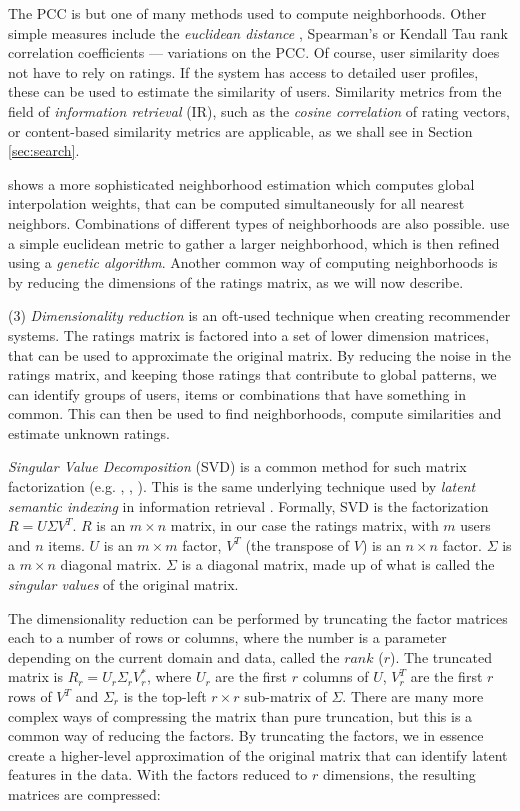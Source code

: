 The PCC is but one of many methods used to compute neighborhoods. 
Other simple measures include the \emph{euclidean distance} \cite[p10]{Segaran2007},
Spearman's or Kendall Tau rank correlation coefficients \cite[p30]{Herlocker2004} --- 
variations on the PCC.
Of course, user similarity does not have to rely on ratings. 
If the system has access to detailed user profiles, these can be used
to estimate the similarity of users.
Similarity metrics from the field of \emph{information retrieval} (IR),
such as the \emph{cosine correlation} of rating vectors,
or content-based similarity metrics are applicable,
as we shall see in Section \ref{sec:search}.

\cite{Bell2007a} shows a more sophisticated neighborhood estimation which computes global interpolation weights,
that can be computed simultaneously for all nearest neighbors.
Combinations of different types of neighborhoods are also possible. 
\cite{Ujjin} use a simple euclidean metric to gather a larger neighborhood, which is then refined using a \emph{genetic algorithm}.
Another common way of computing neighborhoods is by reducing the dimensions of the ratings matrix, as we will now describe.

(3) \emph{Dimensionality reduction} is an oft-used technique when creating recommender systems.
The ratings matrix is factored into a set of lower dimension matrices, that can be used to approximate the original matrix.
By reducing the noise in the ratings matrix, and keeping those ratings that contribute to global patterns,
we can identify groups of users, items or combinations that have something in common.
This can then be used to find neighborhoods, compute similarities and estimate unknown ratings.

\emph{Singular Value Decomposition} (SVD) is a common method for such matrix factorization (e.g. \citet[p5]{Billsus}, \citet{Sun2005}, \citet{Bell2007}).  
This is the same underlying technique used by \emph{latent semantic indexing} in information retrieval \cite[p44]{Baeza-Yates1999}.
Formally, SVD is the factorization $R = U \Sigma V^{T}$. 
$R$ is an $m \times n$ matrix, in our case the ratings matrix, with $m$ users and $n$ items. 
$U$ is an $m \times m$ factor, $V^{T}$ (the transpose of $V$) is an $n \times n$ factor.
$\Sigma$ is a $m \times n$ diagonal matrix. 
$\Sigma$ is a diagonal matrix, made up of what is called the \emph{singular values} of the original matrix.

The dimensionality reduction can be performed by truncating the factor matrices each to a number of rows or columns, 
where the number is a parameter depending on the current domain and data, called the $rank$ ($r$).
The truncated matrix is $R_r = U_r \Sigma_r V_r^{*}$, where $U_r$ are the first $r$ columns of $U$,
$V_r^{T}$ are the first $r$ rows of $V^{T}$ and $\Sigma_r$ is the top-left $r \times r$ sub-matrix of $\Sigma$.
There are many more complex ways of compressing the matrix than pure truncation, but this is a common way of reducing the factors.
By truncating the factors, we in essence create a higher-level approximation of the original matrix that can identify latent features in the data.
With the factors reduced to $r$ dimensions, the resulting matrices are compressed:

